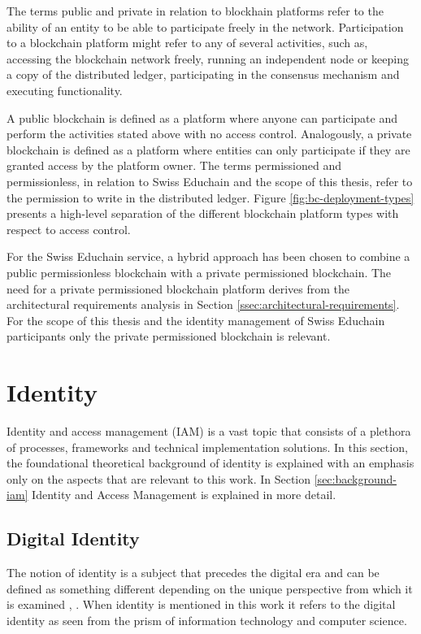The terms public and private in relation to blockhain platforms refer to the ability of an entity to be able to participate freely in the network. Participation to a blockchain platform might refer to any of several activities, such as, accessing the blockchain network freely, running an independent node or keeping a copy of the distributed ledger, participating in the consensus mechanism and executing functionality. 

A public blockchain is defined as a platform where anyone can participate and perform the activities stated above with no access control. Analogously, a private blockchain is defined as a platform where entities can only participate if they are granted access by the platform owner. The terms permissioned and permissionless, in relation to Swiss Educhain and the scope of this thesis, refer to the permission to write in the distributed ledger. Figure \ref{fig:bc-deployment-types} presents a high-level separation of the different blockchain platform types with respect to access control.

For the Swiss Educhain service, a hybrid approach has been chosen to combine a public permissionless blockchain with a private permissioned blockchain. The need for a private permissioned blockchain platform derives from the architectural requirements analysis in Section \ref{ssec:architectural-requirements}. For the scope of this thesis and the identity management of Swiss Educhain participants only the private permissioned blockchain is relevant. 


\section{Identity} \label{sec:background-identity}

Identity and access management (IAM) is a vast topic that consists of a plethora of processes, frameworks and technical implementation solutions. In this section, the foundational theoretical background of identity is explained with an emphasis only on the aspects that are relevant to this work. In Section \ref{sec:background-iam} Identity and Access Management is explained in more detail.

\subsection{Digital Identity}

The notion of identity is a subject that precedes the digital era and can be defined as something different depending on the unique perspective from which it is examined \cite{sociology-identity}, \cite{psychology-identity}. When identity is mentioned in this work it refers to the digital identity as seen from the prism of information technology and computer science.

